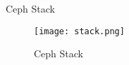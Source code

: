 \begin{frame}[t]{Ceph Stack}
    \begin{figure}[htpb]
        \centering
        \texttt{[image: stack.png]}
        \caption{Ceph Stack}
        \label{fig:stack}
    \end{figure}
\end{frame}

%
